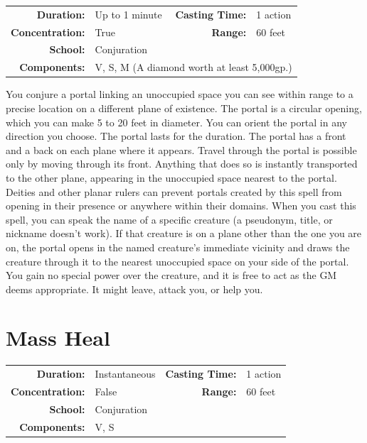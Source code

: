 \documentclass[12pt]{memoir}
\begin{document}
{
\small\centering\vspace{-6pt}
\begin{tabular}{rlrl}
\toprule

\textbf{Duration:} & Up to 1 minute &
\textbf{Casting Time:} & 1 action \\
\textbf{Concentration:} & True &
\textbf{Range:} & 60 feet \\
\textbf{School:} & Conjuration \\
\textbf{Components:} & \multicolumn{3}{p{0.7\textwidth}}{V, S, M (A diamond worth at least 5,000gp.)}\\

\bottomrule
\end{tabular}
}

\vspace{1\baselineskip}\noindent You conjure a portal linking an unoccupied space you can see within range to a precise location on a different plane of existence. The portal is a circular opening, which you can make 5 to 20 feet in diameter. You can orient the portal in any direction you choose. The portal lasts for the duration. The portal has a front and a back on each plane where it appears. Travel through the portal is possible only by moving through its front. Anything that does so is instantly transported to the other plane, appearing in the unoccupied space nearest to the portal. Deities and other planar rulers can prevent portals created by this spell from opening in their presence or anywhere within their domains. When you cast this spell, you can speak the name of a specific creature (a pseudonym, title, or nickname doesn't work). If that creature is on a plane other than the one you are on, the portal opens in the named creature's immediate vicinity and draws the creature through it to the nearest unoccupied space on your side of the portal. You gain no special power over the creature, and it is free to act as the GM deems appropriate. It might leave, attack you, or help you.

\newpage
\section*{Mass Heal}

{
\small\centering\vspace{-6pt}
\begin{tabular}{rlrl}
\toprule

\textbf{Duration:} & Instantaneous &
\textbf{Casting Time:} & 1 action \\
\textbf{Concentration:} & False &
\textbf{Range:} & 60 feet \\
\textbf{School:} & Conjuration \\
\textbf{Components:} & \multicolumn{3}{p{0.7\textwidth}}{V, S}\\

\bottomrule
\end{tabular}
}
\end{document}
